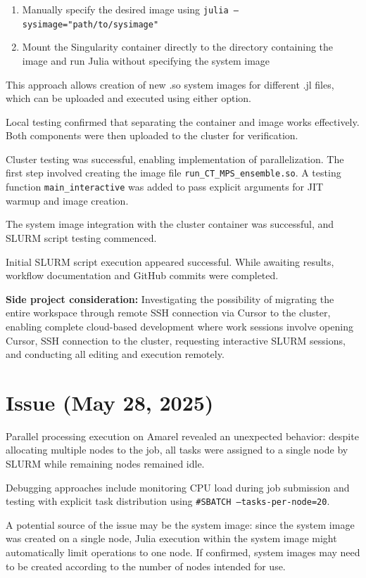 \documentclass[11pt,a4paper]{article}
\begin{document}
\begin{enumerate}
    \item Manually specify the desired image using \texttt{julia --sysimage="path/to/sysimage"}
    \item Mount the Singularity container directly to the directory containing the image and run Julia without specifying the system image
\end{enumerate}

This approach allows creation of new .so system images for different .jl files, which can be uploaded and executed using either option.

Local testing confirmed that separating the container and image works effectively. Both components were then uploaded to the cluster for verification.

Cluster testing was successful, enabling implementation of parallelization. The first step involved creating the image file \texttt{run\_CT\_MPS\_ensemble.so}. A testing function \texttt{main\_interactive} was added to pass explicit arguments for JIT warmup and image creation.

The system image integration with the cluster container was successful, and SLURM script testing commenced.

Initial SLURM script execution appeared successful. While awaiting results, workflow documentation and GitHub commits were completed.

\textbf{Side project consideration:} Investigating the possibility of migrating the entire workspace through remote SSH connection via Cursor to the cluster, enabling complete cloud-based development where work sessions involve opening Cursor, SSH connection to the cluster, requesting interactive SLURM sessions, and conducting all editing and execution remotely.

\section{Issue (May 28, 2025)}

Parallel processing execution on Amarel revealed an unexpected behavior: despite allocating multiple nodes to the job, all tasks were assigned to a single node by SLURM while remaining nodes remained idle.

Debugging approaches include monitoring CPU load during job submission and testing with explicit task distribution using \texttt{\#SBATCH --tasks-per-node=20}.

A potential source of the issue may be the system image: since the system image was created on a single node, Julia execution within the system image might automatically limit operations to one node. If confirmed, system images may need to be created according to the number of nodes intended for use.
\end{document}

